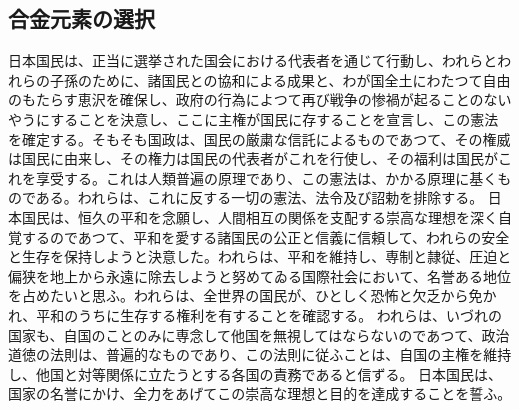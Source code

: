 
\subsection{合金元素の選択}
日本国民は、正当に選挙された国会における代表者を通じて行動し、われらとわれらの子孫のために、諸国民との協和による成果と、わが国全土にわたつて自由のもたらす恵沢を確保し、政府の行為によつて再び戦争の惨禍が起ることのないやうにすることを決意し、ここに主権が国民に存することを宣言し、この憲法を確定する。そもそも国政は、国民の厳粛な信託によるものであつて、その権威は国民に由来し、その権力は国民の代表者がこれを行使し、その福利は国民がこれを享受する。これは人類普遍の原理であり、この憲法は、かかる原理に基くものである。われらは、これに反する一切の憲法、法令及び詔勅を排除する。
日本国民は、恒久の平和を念願し、人間相互の関係を支配する崇高な理想を深く自覚するのであつて、平和を愛する諸国民の公正と信義に信頼して、われらの安全と生存を保持しようと決意した。われらは、平和を維持し、専制と隷従、圧迫と偏狭を地上から永遠に除去しようと努めてゐる国際社会において、名誉ある地位を占めたいと思ふ。われらは、全世界の国民が、ひとしく恐怖と欠乏から免かれ、平和のうちに生存する権利を有することを確認する。
われらは、いづれの国家も、自国のことのみに専念して他国を無視してはならないのであつて、政治道徳の法則は、普遍的なものであり、この法則に従ふことは、自国の主権を維持し、他国と対等関係に立たうとする各国の責務であると信ずる。
日本国民は、国家の名誉にかけ、全力をあげてこの崇高な理想と目的を達成することを誓ふ。
